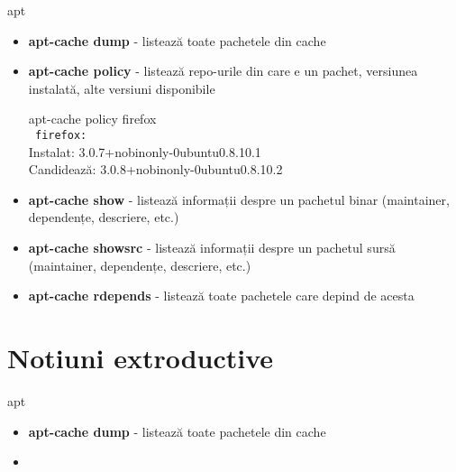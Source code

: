 \documentclass{beamer}
\begin{document}
\begin{frame}{apt}
  \begin{itemize}
  \item \textbf{apt-cache dump} - listează toate pachetele din cache
  \item \textbf{apt-cache policy} - listează repo-urile din care e un pachet, versiunea instalată, alte versiuni disponibile
    \begin{beamerboxesrounded}[lower=block body,shadow=true,width=8cm]{}
      apt-cache policy firefox \\
      \texttt{   firefox:}\\
      Instalat: 3.0.7+nobinonly-0ubuntu0.8.10.1 \\
      Candidează: 3.0.8+nobinonly-0ubuntu0.8.10.2
    \end{beamerboxesrounded}
  \item \textbf{apt-cache show} - listează informații despre un pachetul binar (maintainer, dependențe, descriere, etc.)
  \item \textbf{apt-cache showsrc} - listează informații despre un pachetul sursă (maintainer, dependențe, descriere, etc.)
  \item \textbf{apt-cache rdepends} - listează toate pachetele care depind de acesta
  \end{itemize}
\end{frame}


\section{Notiuni extroductive}
\frame{\tableofcontents[currentsection]}

\begin{frame}{apt}
  \begin{itemize}
  \item \textbf{apt-cache dump} - listează toate pachetele din cache
    \item 
  \end{itemize}
\end{frame}
\end{document}
